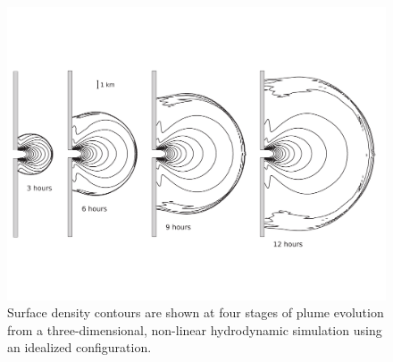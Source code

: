 \documentclass[12pt]{article}
\begin{document}







\clearpage
\listoffigures

\clearpage

\begin{figure}
    \centering
    \includegraphics[width=6in]{Figures/plume_expansion_frames.pdf}
    \caption{Surface density contours are shown at four stages of plume evolution from a three-dimensional, non-linear hydrodynamic simulation using an idealized configuration.}
    \label{fig:3d_expansion}
\end{figure}
\end{document}
